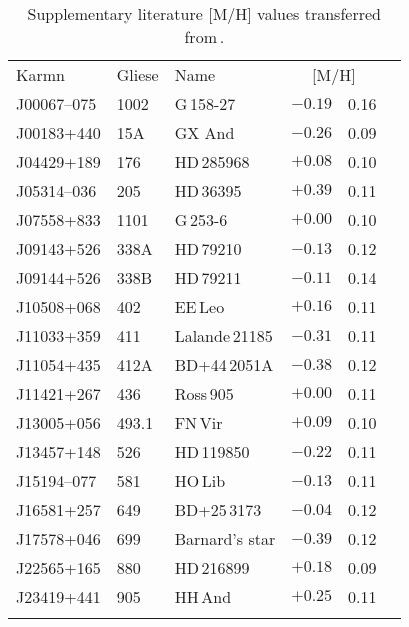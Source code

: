 \documentclass{aa}
\begin{document}
\begin{table}[]
\caption{Supplementary literature [M/H] values transferred from\,\citet{Passegger2022}.}
\label{tab:lit_zeta}
\centering %
\begin{tabular}{lllr@{\,$\pm$\,}lc}
   \hline
    \hline
    \noalign{\smallskip}
    Karmn    & Gliese   & Name   & \multicolumn{2}{c}{[M/H]} \\
    \noalign{\smallskip}
    \hline
    \noalign{\smallskip}
J00067--075 & 1002  & G\,158-27       & $-0.19$ & 0.16 \\ 
J00183+440 & 15A   & GX And          & $-0.26$ & 0.09 \\
J04429+189 & 176   & HD\,285968      & $+0.08$ & 0.10 \\
J05314--036 & 205   & HD\,36395       & $+0.39$ & 0.11 \\
J07558+833 & 1101  & G\,253-6        & $+0.00$ & 0.10 \\
J09143+526 & 338A  & HD\,79210       & $-0.13$ & 0.12 \\
J09144+526 & 338B  & HD\,79211       & $-0.11$ & 0.14 \\
J10508+068 & 402   & EE\,Leo         & $+0.16$ & 0.11 \\
J11033+359 & 411   & Lalande\,21185  & $-0.31$ & 0.11 \\
J11054+435 & 412A  & BD+44\,2051A    & $-0.38$ & 0.12 \\
J11421+267 & 436   & Ross\,905       & $+0.00$ & 0.11 \\
J13005+056 & 493.1 & FN\,Vir         & $+0.09$ & 0.10 \\
J13457+148 & 526   & HD\,119850      & $-0.22$ & 0.11 \\
J15194--077 & 581   & HO\,Lib         & $-0.13$ & 0.11 \\
J16581+257 & 649   & BD+25\,3173     & $-0.04$ & 0.12 \\
J17578+046 & 699   & Barnard's star  & $-0.39$ & 0.12 \\
J22565+165 & 880   & HD\,216899      & $+0.18$ & 0.09 \\
J23419+441 & 905   & HH\,And         & $+0.25$ & 0.11 \\
    \noalign{\smallskip}
    \hline
\end{tabular}
\end{table}
\end{document}
